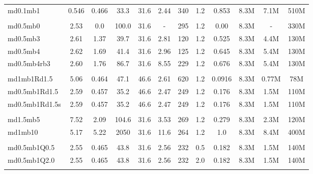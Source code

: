 \begin{table*}
\begin{center}
\begin{tabular}{lccccccccccc}
md0.1mb1      & 0.546 & 0.466 & 33.3 & 31.6 & 2.44 & 340 & 1.2  & 0.853 & 8.3M & 7.1M & 510M \\%
\\
md0.5mb0      & 2.53 &  0.0 & 100.0 & 31.6 & - & 295 & 1.2  & 0.00 & 8.3M & - & 330M \\%
md0.5mb3      & 2.61 &  1.37 & 39.7 & 31.6 & 2.81 & 120 & 1.2 & 0.525 & 8.3M & 4.4M & 130M \\%
md0.5mb4      & 2.62 &  1.69 & 41.4 & 31.6 & 2.96 & 125 & 1.2 & 0.645 & 8.3M & 5.4M & 130M \\%
md0.5mb4rb3   & 2.60 &  1.76 & 86.7 & 31.6 & 8.55 & 229 & 1.2 & 0.676 & 8.3M & 5.4M & 130M \\%
\\ 
md1mb1Rd1.5      & 5.06 &  0.464 & 47.1 & 46.6 & 2.61 & 620 & 1.2 &  0.0916 & 8.3M & 0.77M & 78M \\%
md0.5mb1Rd1.5    & 2.59 &  0.457 & 35.2 & 46.6 & 2.47 & 249 & 1.2 & 0.176 & 8.3M & 1.5M & 110M \\%
md0.5mb1Rd1.5s & 2.59 &  0.457 & 35.2 & 46.6 & 2.47 & 249 & 1.2 & 0.176 & 8.3M & 1.5M & 110M \\%
\\
md1.5mb5      & 7.52  &  2.09  & 104.6 & 31.6 & 3.53 & 269 & 1.2 & 0.279 & 8.3M & 2.3M & 120M \\%
md1mb10       & 5.17  & 5.22  & 2050  & 31.6 & 11.6 & 264 & 1.2 &  1.0 & 8.3M & 8.4M & 400M \\%
\\
md0.5mb1Q0.5   & 2.55 &  0.465 & 43.8 & 31.6 & 2.56 & 232 & 0.5 & 0.182 & 8.3M & 1.5M & 140M \\%
md0.5mb1Q2.0   & 2.55 &  0.465 & 43.8 & 31.6 & 2.56 & 232 & 2.0  & 0.182 & 8.3M & 1.5M & 140M \\%
\\
\hline
\end{tabular}
\end{center}
\end{table*}





